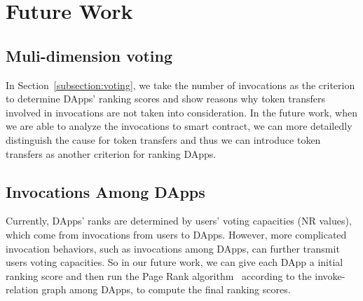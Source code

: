 \section{Future Work}
\subsection{Muli-dimension voting}
In Section~\ref{subsection:voting}, we take the number of invocations as the criterion to determine DApps' ranking scores and show reasons why token transfers involved in invocations are not taken into consideration. In the future work, when we are able to analyze the invocations to smart contract, we can more detailedly distinguish the cause for token transfers and thus we can introduce token transfers as another criterion for ranking DApps. 

\subsection{Invocations Among DApps}
Currently, DApps' ranks are determined by users' voting capacities (NR values), which come from invocations from users to DApps. However, more complicated invocation behaviors, such as invocations among DApps, can further transmit users voting capacities. So in our future work, we can give each DApp a initial ranking score and then run the Page Rank algorithm~\cite{page1999pagerank} according to the invoke-relation graph among DApps, to compute the final ranking scores.